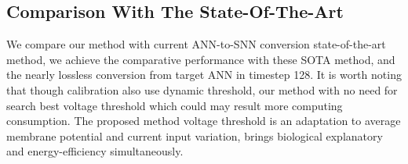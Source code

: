 \documentclass{article}
\begin{document}
\subsection{Comparison With The State-Of-The-Art}
We compare our method with current ANN-to-SNN conversion state-of-the-art method, 
we achieve the comparative performance with these SOTA method, and the nearly lossless conversion from target ANN in timestep 128.
It is worth noting that though calibration also use dynamic threshold, our method with no need for search best voltage threshold which could may result more computing consumption. The proposed method voltage threshold is an adaptation
to average membrane potential and current input variation, brings biological explanatory and energy-efficiency simultaneously.
\begin{table}[htbp]
  \centering
  \caption{Experimental results on CIFAR10 and CIFAR100}
  \begin{threeparttable}
\end{threeparttable}
\end{table}
\end{document}
